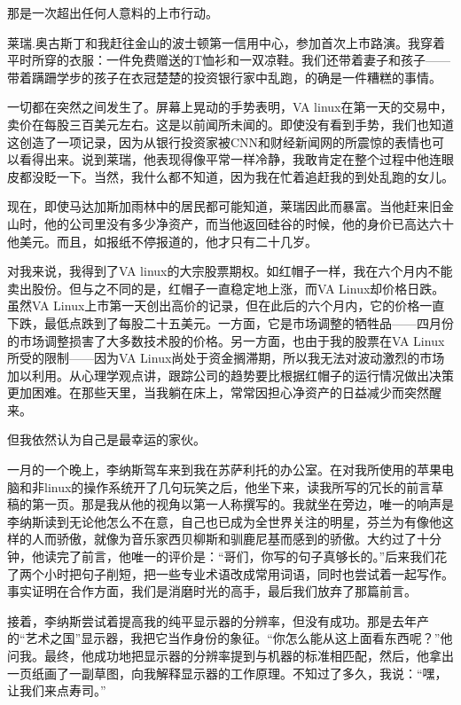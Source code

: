 那是一次超出任何人意料的上市行动。

莱瑞.奥古斯丁和我赶往金山的波士顿第一信用中心，参加首次上市路演。我穿着平时所穿的衣服：一件免费赠送的T恤衫和一双凉鞋。我们还带着妻子和孩子——带着蹒跚学步的孩子在衣冠楚楚的投资银行家中乱跑，的确是一件糟糕的事情。

一切都在突然之间发生了。屏幕上晃动的手势表明，VA linux在第一天的交易中，卖价在每股三百美元左右。这是以前闻所未闻的。即使没有看到手势，我们也知道这创造了一项记录，因为从银行投资家被CNN和财经新闻网的所震惊的表情也可以看得出来。说到莱瑞，他表现得像平常一样冷静，我敢肯定在整个过程中他连眼皮都没眨一下。当然，我什么都不知道，因为我在忙着追赶我的到处乱跑的女儿。

现在，即使马达加斯加雨林中的居民都可能知道，莱瑞因此而暴富。当他赶来旧金山时，他的公司里没有多少净资产，而当他返回硅谷的时候，他的身价已高达六十他美元。而且，如报纸不停报道的，他才只有二十几岁。

对我来说，我得到了VA linux的大宗股票期权。如红帽子一样，我在六个月内不能卖出股份。但与之不同的是，红帽子一直稳定地上涨，而VA Linux却价格日跌。虽然VA Linux上市第一天创出高价的记录，但在此后的六个月内，它的价格一直下跌，最低点跌到了每股二十五美元。一方面，它是市场调整的牺牲品——四月份的市场调整损害了大多数技术股的价格。另一方面，也由于我的股票在VA Linux所受的限制——因为VA Linux尚处于资金搁滞期，所以我无法对波动激烈的市场加以利用。从心理学观点讲，跟踪公司的趋势要比根据红帽子的运行情况做出决策更加困难。在那些天里，当我躺在床上，常常因担心净资产的日益减少而突然醒来。

但我依然认为自己是最幸运的家伙。

 

一月的一个晚上，李纳斯驾车来到我在苏萨利托的办公室。在对我所使用的苹果电脑和非linux的操作系统开了几句玩笑之后，他坐下来，读我所写的冗长的前言草稿的第一页。那是我从他的视角以第一人称撰写的。我就坐在旁边，唯一的响声是李纳斯读到无论他怎么不在意，自己也已成为全世界关注的明星，芬兰为有像他这样的人而骄傲，就像为音乐家西贝柳斯和驯鹿尼基而感到的骄傲。大约过了十分钟，他读完了前言，他唯一的评价是：“哥们，你写的句子真够长的。”后来我们花了两个小时把句子削短，把一些专业术语改成常用词语，同时也尝试着一起写作。事实证明在合作方面，我们是消磨时光的高手，最后我们放弃了那篇前言。

接着，李纳斯尝试着提高我的纯平显示器的分辨率，但没有成功。那是去年产的“艺术之国”显示器，我把它当作身份的象征。“你怎么能从这上面看东西呢？”他问我。最终，他成功地把显示器的分辨率提到与机器的标准相匹配，然后，他拿出一页纸画了一副草图，向我解释显示器的工作原理。不知过了多久，我说：“嘿，让我们来点寿司。”

